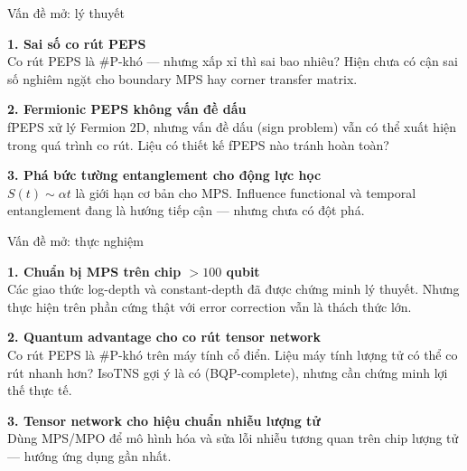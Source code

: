 \documentclass[aspectratio=169, 11pt]{beamer}
\begin{document}
\begin{frame}[shrink=5]{Vấn đề mở: lý thuyết}

\vspace{4pt}
\textcolor{qpink}{\textbf{1. Sai số co rút PEPS}}\\[2pt]
{\small Co rút PEPS là \#P-khó — nhưng xấp xỉ thì sai bao nhiêu? Hiện chưa có cận sai số nghiêm ngặt cho boundary MPS hay corner transfer matrix.}

\vspace{10pt}
\textcolor{qpink}{\textbf{2. Fermionic PEPS không vấn đề dấu}}\\[2pt]
{\small fPEPS xử lý Fermion 2D, nhưng vấn đề dấu (sign problem) vẫn có thể xuất hiện trong quá trình co rút. Liệu có thiết kế fPEPS nào tránh hoàn toàn?}

\vspace{10pt}
\textcolor{qpink}{\textbf{3. Phá bức tường entanglement cho động lực học}}\\[2pt]
{\small $S(t) \sim \alpha t$ là giới hạn cơ bản cho MPS. Influence functional và temporal entanglement đang là hướng tiếp cận — nhưng chưa có đột phá.}

\end{frame}

\begin{frame}{Vấn đề mở: thực nghiệm}

\vspace{8pt}
\textcolor{qgreen}{\textbf{1. Chuẩn bị MPS trên chip $> 100$ qubit}}\\[2pt]
{\small Các giao thức log-depth và constant-depth đã được chứng minh lý thuyết. Nhưng thực hiện trên phần cứng thật với error correction vẫn là thách thức lớn.}

\vspace{12pt}
\textcolor{qgreen}{\textbf{2. Quantum advantage cho co rút tensor network}}\\[2pt]
{\small Co rút PEPS là \#P-khó trên máy tính cổ điển. Liệu máy tính lượng tử có thể co rút nhanh hơn? IsoTNS gợi ý là có (BQP-complete), nhưng cần chứng minh lợi thế thực tế.}

\vspace{12pt}
\textcolor{qgreen}{\textbf{3. Tensor network cho hiệu chuẩn nhiễu lượng tử}}\\[2pt]
{\small Dùng MPS/MPO để mô hình hóa và sửa lỗi nhiễu tương quan trên chip lượng tử — hướng ứng dụng gần nhất.}

\end{frame}
\end{document}
